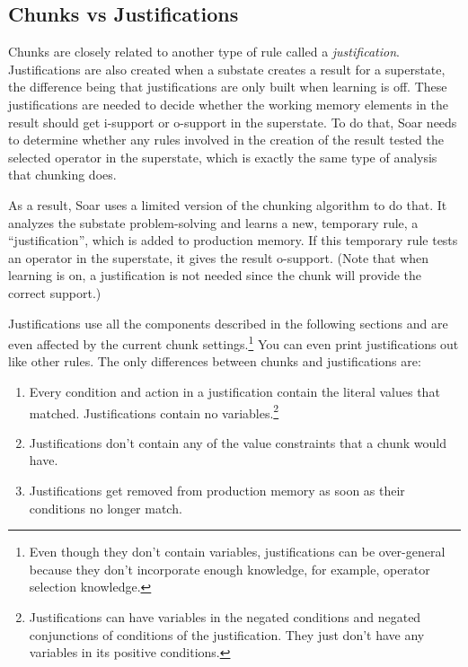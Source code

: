 \subsection{Chunks vs Justifications}

Chunks are closely related to another type of rule called a \textit{justification}.  Justifications are also created when a substate creates a result for a superstate, the difference being that justifications are only built when learning is off.  These justifications are needed to decide whether the working memory elements in the result should get i-support or o-support in the superstate.  To do that, Soar needs to determine whether any rules involved in the creation of the result tested the selected operator in the superstate, which is exactly the same type of analysis that chunking does.

As a result, Soar uses a limited version of the chunking algorithm to do that.  It analyzes the substate problem-solving and learns a new, temporary rule, a ``justification'', which is added to production memory.  If this temporary rule tests an operator in the superstate, it gives the result o-support. (Note that when learning is on, a justification is not needed since the chunk will provide the correct support.)

Justifications use all the components described in the following sections and are even affected by the current chunk settings.\footnote{
	Even though they don't contain variables, justifications can be over-general because they don't incorporate enough knowledge, for example, operator selection knowledge.}
 You can even print justifications out like other rules.  The only differences between chunks and justifications are:
 
 \begin{enumerate}
	\item Every condition and action in a justification contain the literal values that matched.  Justifications contain no variables.\footnote{
		Justifications can have variables in the negated conditions and negated conjunctions of conditions of the justification.  They just don't have any variables in its positive conditions.}
	\item Justifications don't contain any of the value constraints that a chunk would have.
	\item Justifications get removed from production memory as soon as their conditions no longer match. 
 \end{enumerate}

